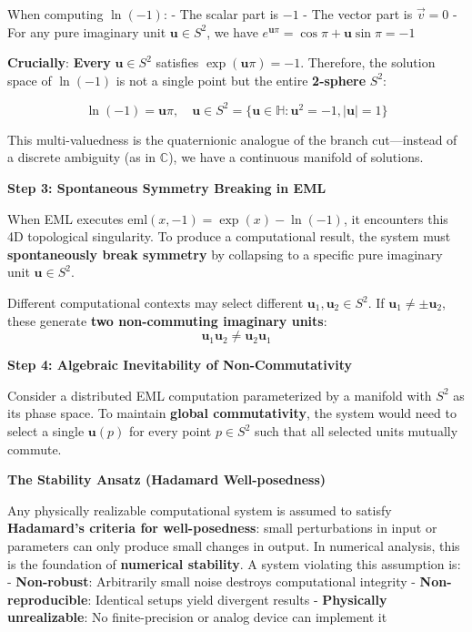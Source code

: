 \documentclass[11pt]{article}
\begin{document}
When computing \(\ln(-1)\): - The scalar part is \(-1\) - The vector part is \(\vec{v} = 0\) - For any pure imaginary unit \(\mathbf{u} \in S^2\), we have \(e^{\mathbf{u}\pi} = \cos\pi + \mathbf{u}\sin\pi = -1\)

\textbf{Crucially}: \textbf{Every} \(\mathbf{u} \in S^2\) satisfies \(\exp(\mathbf{u}\pi) = -1\). Therefore, the solution space of \(\ln(-1)\) is not a single point but the entire \textbf{2-sphere} \(S^2\):

\[\ln(-1) = \mathbf{u}\pi, \quad \mathbf{u} \in S^2 = \{\mathbf{u} \in \mathbb{H} : \mathbf{u}^2 = -1, |\mathbf{u}| = 1\}\]

This multi-valuedness is the quaternionic analogue of the branch cut---instead of a discrete ambiguity (as in $\mathbb{C}$), we have a continuous manifold of solutions.

\textbf{Step 3: Spontaneous Symmetry Breaking in EML}

When EML executes \(\mathrm{eml}(x, -1) = \exp(x) - \ln(-1)\), it encounters this 4D topological singularity. To produce a computational result, the system must \textbf{spontaneously break symmetry} by collapsing to a specific pure imaginary unit \(\mathbf{u} \in S^2\).

Different computational contexts may select different \(\mathbf{u}_1, \mathbf{u}_2 \in S^2\). If \(\mathbf{u}_1 \neq \pm \mathbf{u}_2\), these generate \textbf{two non-commuting imaginary units}: \[\mathbf{u}_1\mathbf{u}_2 \neq \mathbf{u}_2\mathbf{u}_1\]

\textbf{Step 4: Algebraic Inevitability of Non-Commutativity}

Consider a distributed EML computation parameterized by a manifold with \(S^2\) as its phase space. To maintain \textbf{global commutativity}, the system would need to select a single \(\mathbf{u}(p)\) for every point \(p \in S^2\) such that all selected units mutually commute.

\textbf{The Stability Ansatz (Hadamard Well-posedness)}

Any physically realizable computational system is assumed to satisfy \textbf{Hadamard's criteria for well-posedness}: small perturbations in input or parameters can only produce small changes in output. In numerical analysis, this is the foundation of \textbf{numerical stability}. A system violating this assumption is: - \textbf{Non-robust}: Arbitrarily small noise destroys computational integrity - \textbf{Non-reproducible}: Identical setups yield divergent results - \textbf{Physically unrealizable}: No finite-precision or analog device can implement it
\end{document}
